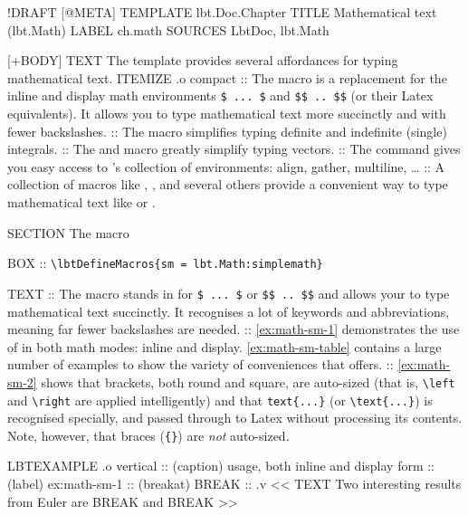 \begin{lbt}
  !DRAFT
  [@META]
    TEMPLATE lbt.Doc.Chapter
    TITLE Mathematical text \textsf{(lbt.Math)}
    LABEL ch.math
    SOURCES LbtDoc, lbt.Math

  [+BODY]
    TEXT The  template provides several affordances for typing mathematical text.
    ITEMIZE .o compact
    :: The  macro is a replacement for the inline and display math environments \Verb|$ ... $| and \Verb|$$ .. $$| (or their Latex equivalents). It allows you to type mathematical text more succinctly and with fewer backslashes.
    :: The  macro simplifies typing definite and indefinite (single) integrals.
    :: The  and  macro greatly simplify typing vectors.
    :: The  command gives you easy access to 's collection of environments: align, gather, multiline, \dots
    :: A collection of macros like , ,  and several others provide a convenient way to type mathematical text like  or .

    SECTION The  macro

    BOX :: \verb|\lbtDefineMacros{sm = lbt.Math:simplemath}|

    TEXT
    :: The  macro stands in for \Verb|$ ... $| or \Verb|$$ .. $$| and allows your to type mathematical text succinctly. It recognises a lot of keywords and abbreviations, meaning far fewer backslashes are needed.
    :: \cref{ex:math-sm-1} demonstrates the use of  in both math modes: inline and display. \cref{ex:math-sm-table} contains a large number of examples to show the variety of conveniences that  offers.
    :: \cref{ex:math-sm-2} shows that brackets, both round and square, are auto-sized (that is, \Verb|\left| and \Verb|\right| are applied intelligently) and that \Verb|text{...}| (or \Verb|\text{...}|) is recognised specially, and passed through to Latex without processing its contents. Note, however, that braces (\Verb|{}|) are \emph{not} auto-sized.

    LBTEXAMPLE .o vertical
    :: (caption)  usage, both inline and display form
    :: (label) ex:math-sm-1
    :: (breakat) BREAK
    :: .v <<
      TEXT Two interesting results from Euler are BREAK  and BREAK 
    >>


\end{lbt}
